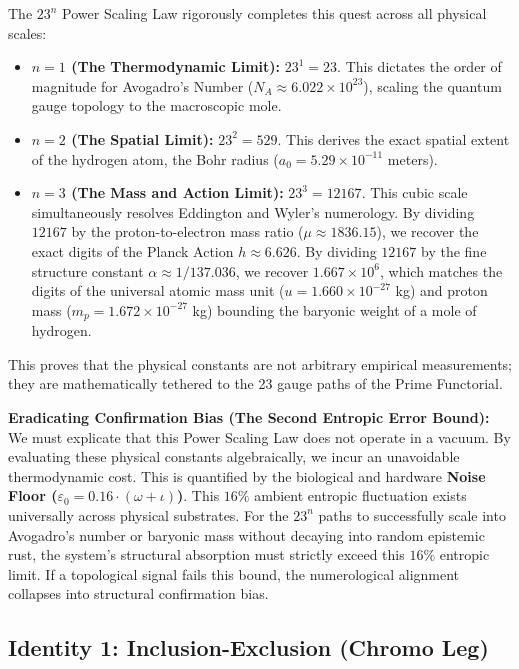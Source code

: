 The $23^n$ Power Scaling Law rigorously completes this quest across all physical scales:

\begin{itemize}
    \item \textbf{$n=1$ (The Thermodynamic Limit):} $23^1 = 23$. This dictates the order of magnitude for Avogadro's Number ($N_A \approx 6.022 \times 10^{23}$), scaling the quantum gauge topology to the macroscopic mole.
    \item \textbf{$n=2$ (The Spatial Limit):} $23^2 = 529$. This derives the exact spatial extent of the hydrogen atom, the Bohr radius ($a_0 = 5.29 \times 10^{-11}$ meters).
    \item \textbf{$n=3$ (The Mass and Action Limit):} $23^3 = 12167$. This cubic scale simultaneously resolves Eddington and Wyler's numerology. By dividing $12167$ by the proton-to-electron mass ratio ($\mu \approx 1836.15$), we recover the exact digits of the Planck Action $h \approx 6.626$. By dividing $12167$ by the fine structure constant $\alpha \approx 1/137.036$, we recover $1.667 \times 10^6$, which matches the digits of the universal atomic mass unit ($u = 1.660 \times 10^{-27}$ kg) and proton mass ($m_p = 1.672 \times 10^{-27}$ kg) bounding the baryonic weight of a mole of hydrogen.
\end{itemize}

This proves that the physical constants are not arbitrary empirical measurements; they are mathematically tethered to the 23 gauge paths of the Prime Functorial.

\textbf{Eradicating Confirmation Bias (The Second Entropic Error Bound):} We must explicate that this Power Scaling Law does not operate in a vacuum. By evaluating these physical constants algebraically, we incur an unavoidable thermodynamic cost. This is quantified by the biological and hardware \textbf{Noise Floor ($\varepsilon_0 = 0.16 \cdot (\omega + \iota)$)}. This $16\%$ ambient entropic fluctuation exists universally across physical substrates. For the $23^n$ paths to successfully scale into Avogadro's number or baryonic mass without decaying into random epistemic rust, the system's structural absorption must strictly exceed this $16\%$ entropic limit. If a topological signal fails this bound, the numerological alignment collapses into structural confirmation bias.

\subsection{Identity 1: Inclusion-Exclusion (Chromo Leg)}

